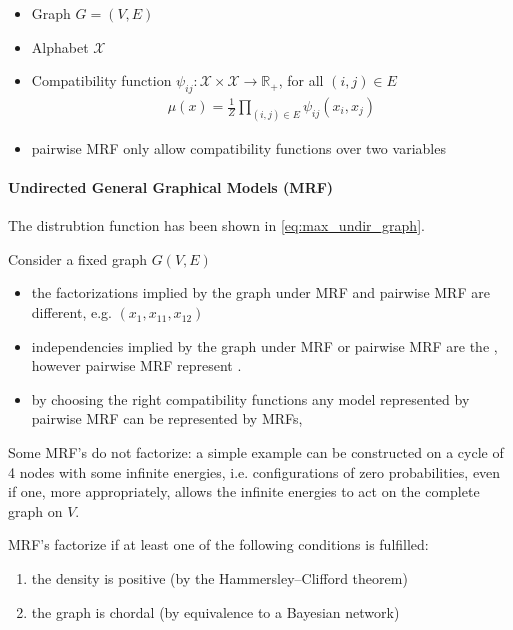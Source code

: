 \documentclass{article}
\begin{document}
\begin{itemize}
    \item Graph $G=(V, E)$
    \item Alphabet $\mathcal{X}$
    \item Compatibility function $\psi_{i j}: \mathcal{X} \times \mathcal{X} \rightarrow \mathbb{R}_{+}$, for all $(i, j) \in E$
\begin{align}
\mu(x)=\frac{1}{Z} \prod_{(i, j) \in E} \psi_{i j}\left(x_{i}, x_{j}\right)\label{eq:bdadc}
\end{align}
\item pairwise MRF only allow compatibility functions over two variables
\end{itemize}

\paragraph{Undirected General Graphical Models (MRF)}
The distrubtion function has been shown in \cref{eq:max_undir_graph}.

Consider a fixed graph $G(V, E)$
\begin{itemize}
    \item the factorizations implied by the graph under MRF and pairwise MRF are different, e.g. $\left(x_{1}, x_{11}, x_{12}\right)$
    \item independencies implied by the graph under MRF or pairwise MRF are the , however pairwise MRF represent .
    \item by choosing the right compatibility functions any model represented by pairwise MRF can be represented by MRFs, 
\end{itemize}
\begin{rema}
Some MRF's do not factorize: a simple example can be constructed on a cycle of 4 nodes with some infinite energies, i.e. configurations of zero probabilities, even if one, more appropriately, allows the infinite energies to act on the complete graph on $V$.

MRF's factorize if at least one of the following conditions is fulfilled:
\begin{enumerate}
    \item the density is positive (by the Hammersley–Clifford theorem)
    \item the graph is chordal (by equivalence to a Bayesian network)
\end{enumerate}
\end{rema}
\end{document}
